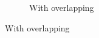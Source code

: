 \begin{frame}
\begin{figure}
\begin{subfigure}{0.42\textwidth}
      \caption{With overlapping}
      \label{FIG:Benchmark:FIG_Benchmark_hybrid_1_single_nodes_3D}
    \end{subfigure}
    \label{FIG:Benchmark:Hybrid_Single_Node_3D}
  \end{figure}

\end{frame}









